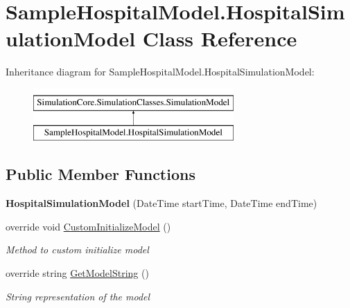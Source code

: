 \hypertarget{class_sample_hospital_model_1_1_hospital_simulation_model}{}\section{Sample\+Hospital\+Model.\+Hospital\+Simulation\+Model Class Reference}
\label{class_sample_hospital_model_1_1_hospital_simulation_model}
Inheritance diagram for Sample\+Hospital\+Model.\+Hospital\+Simulation\+Model\+:\begin{figure}[H]
\begin{center}
\leavevmode
\includegraphics[height=2.000000cm]{class_sample_hospital_model_1_1_hospital_simulation_model}
\end{center}
\end{figure}
\subsection*{Public Member Functions}
\begin{DoxyCompactItemize}
\item 
{\bfseries Hospital\+Simulation\+Model} (Date\+Time start\+Time, Date\+Time end\+Time)\hypertarget{class_sample_hospital_model_1_1_hospital_simulation_model_ae469e92fe9518f6df664d1107efd69a5}{}\label{class_sample_hospital_model_1_1_hospital_simulation_model_ae469e92fe9518f6df664d1107efd69a5}

\item 
override void \hyperlink{class_sample_hospital_model_1_1_hospital_simulation_model_a1744e6f2bed7df76c682ec850499d1e7}{Custom\+Initialize\+Model} ()
\begin{DoxyCompactList}\small\item\em Method to custom initialize model \end{DoxyCompactList}\item 
override string \hyperlink{class_sample_hospital_model_1_1_hospital_simulation_model_a29157b956cb2bcfdf22e44fffc99b5d3}{Get\+Model\+String} ()
\begin{DoxyCompactList}\small\item\em String representation of the model \end{DoxyCompactList}\end{DoxyCompactItemize}
